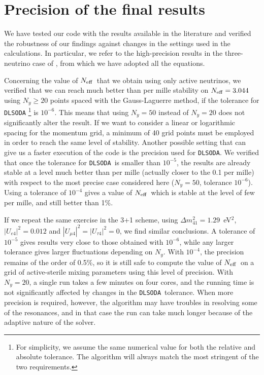 \documentclass[notitlepage,showpacs,preprintnumbers,amsmath,amssymb,superscriptaddress,prd,onecolumn]{revtex4-1}
\newcommand{\Neff}{\ensuremath{N_{\rm eff}}}
\newcommand{\dmsq}[1]{\ensuremath{\Delta m^2_{#1}}}
\newcommand{\uasq}[1]{\ensuremath{|U_{#1 4}|^2}}
\newcommand{\dlsoda}{\texttt{DLSODA}}
\begin{document}
\section{Precision of the final results}
\label{ssec:precision}
We have tested our code with the results available in the literature and
verified the robustness of our findings against changes in the settings used in the calculations.
In particular, we refer to the high-precision results in the three-neutrino case of \cite{deSalas:2016ztq},
from which we have adopted all the equations.

Concerning the value of \Neff\ that we obtain using only active neutrinos,
we verified that we can reach much better than per mille stability on $\Neff=3.044$
using $N_y\geq20$ points spaced with the Gauss-Laguerre method,
if the tolerance for \dlsoda%
\footnote{For simplicity, we assume the same numerical value for both the relative and absolute tolerance.
The algorithm will always match the most stringent of the two requirements.}
is $10^{-6}$.
This means that using $N_y=50$ instead of $N_y=20$ does not significantly alter the result.
If we want to consider a linear or logarithmic spacing for the momentum grid,
a minimum of 40 grid points must be employed in order to reach the same level of stability.
Another possible setting that can give us a faster execution of the code is the precision
used for \dlsoda.
We verified that once the tolerance for \dlsoda\ is smaller than $10^{-5}$,
the results are already stable at a level much better than per mille
(actually closer to the 0.1 per mille)
with respect to the most precise case considered here
($N_y=50$, tolerance $10^{-6}$).
Using a tolerance of $10^{-4}$ gives a value of \Neff\ which is stable
at the level of few per mille, and still better than 1\%.

If we repeat the same exercise in the 3+1 scheme,
using $\dmsq{41}=1.29$~eV$^2$,
$\uasq{e}=0.012$ \cite{Gariazzo:2018mwd} and $\uasq{\mu}=\uasq{\tau}=0$,
we find similar conclusions.
A tolerance of $10^{-5}$ gives results very close to those obtained with $10^{-6}$,
while any larger tolerance gives larger fluctuations depending on $N_y$.
With $10^{-4}$, the precision remains of the order of 0.5\%, so it is still safe to compute the value of \Neff\ on a grid of active-sterile mixing parameters
using this level of precision.
With $N_y=20$, a single run takes a few minutes on four cores, and the running time is not significantly affected
by changes in the \dlsoda\ tolerance.
When more precision is required, however, the algorithm may have troubles in resolving some of the resonances,
and in that case the run can take much longer because of the adaptive nature of the solver.
\end{document}
